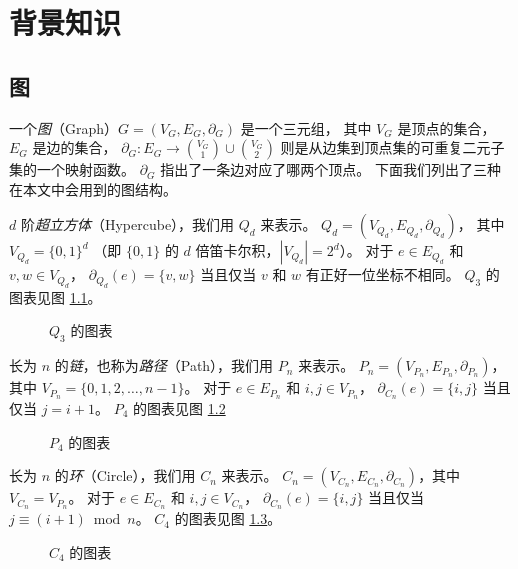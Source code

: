 
\chapter{背景知识}
\label{Chapter 2}

\section{图}
\label{Section 2.1}

一个\emph{图}（Graph）$G = (V_G, E_G, \partial_G)$ 是一个三元组，
其中 $V_G$ 是顶点的集合，$E_G$ 是边的集合，
$\partial_G \colon E_G \rightarrow \binom{V_G}{1} \cup \binom{V_G}{2}$
则是从边集到顶点集的可重复二元子集的一个映射函数。
$\partial_G$ 指出了一条边对应了哪两个顶点。
下面我们列出了三种在本文中会用到的图结构。

$d$ 阶\emph{超立方体}（Hypercube），我们用 $Q_d$ 来表示。
$Q_d = (V_{Q_d}, E_{Q_d}, \partial_{Q_d})$，
其中 $V_{Q_d} = \{0, 1\}^d$
（即 $\{0, 1\}$ 的 $d$ 倍笛卡尔积，$|V_{Q_d}| = 2^d$）。
对于 $e \in E_{Q_d}$ 和 $v, w \in V_{Q_d}$，
$\partial_{Q_d}(e) = \{v, w\}$ 当且仅当 $v$ 和 $w$ 有正好一位坐标不相同。
$Q_3$ 的图表见图 \ref{Figure 2-1}。

\begin{figure}[h!]
	\centering
	
	\caption{$Q_3$ 的图表}
	\label{Figure 2-1}
\end{figure}

长为 $n$ 的\emph{链}，也称为\emph{路径}（Path），我们用 $P_n$ 来表示。
$P_n = (V_{P_n}, E_{P_n}, \partial_{P_n})$，
其中 $V_{P_n} = \{0, 1, 2, \dots, n - 1\}$。
对于 $e \in E_{P_n}$ 和 $i, j \in V_{P_n}$，
$\partial_{C_n}(e) = \{i, j\}$ 当且仅当 $j = i + 1$。
$P_4$ 的图表见图 \ref{Figure 2-2}

\begin{figure}[h!]
	\centering
	
	\caption{$P_4$ 的图表}
	\label{Figure 2-2}
\end{figure}

长为 $n$ 的\emph{环}（Circle），我们用 $C_n$ 来表示。
$C_n = (V_{C_n}, E_{C_n}, \partial_{C_n})$，其中 $V_{C_n} = V_{P_n}$。
对于 $e \in E_{C_n}$ 和 $i, j \in V_{C_n}$，
$\partial_{C_n}(e) = \{i, j\}$ 当且仅当 $j \equiv (i + 1) \bmod n$。
$C_4$ 的图表见图 \ref{Figure 2-3}。

\begin{figure}[h!]
	\centering
	
	\caption{$C_4$ 的图表}
	\label{Figure 2-3}
\end{figure}

